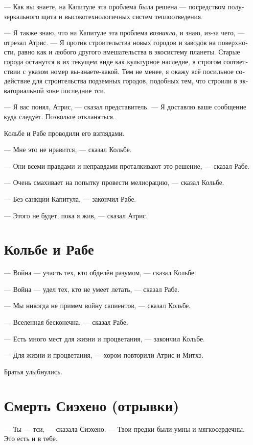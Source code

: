 \documentclass[a4paper,12pt,fleqn]{book}\usepackage{cooltooltips}\usepackage{polyglossia}\setdefaultlanguage[babelshorthands=true]{russian}\setotherlanguage{english}\defaultfontfeatures{Ligatures=TeX,Mapping=tex-text} \usepackage{xcolor}\definecolor{lightgray}{HTML}{bbbbbb}\color{lightgray}\newcommand{\ml}[3]{\textenglish{\textcolor{black}{#3}}}
\begin{document}
{--- Как вы знаете, на Капитуле эта проблема была решена --- посредством полузеркального щита и высокотехнологичных систем теплоотведения.

--- Я также знаю, что на Капитуле эта проблема \emph{возникла}, и знаю, из-за чего, --- отрезал Атрис.
--- Я против строительства новых городов и заводов на поверхности, равно как и любого другого вмешательства в экосистему планеты.
Старые города останутся в их текущем виде как культурное наследие, в строгом соответствии с указом номер вы-знаете-какой.
Тем не менее, я окажу всё посильное содействие для строительства подземных городов, подобных тем, что строили в экваториальной зоне последние тси.

--- Я вас понял, Атрис, --- сказал представитель.
--- Я доставлю ваше сообщение куда следует.
Позвольте откланяться.

Кольбе и Рабе проводили его взглядами.

--- Мне это не нравится, --- сказал Кольбе.

--- Они всеми правдами и неправдами проталкивают это решение, --- сказал Рабе.

--- Очень смахивает на попытку провести мелиорацию, --- сказал Кольбе.

--- Без санкции Капитула, --- закончил Рабе.

--- Этого не будет, пока я жив, --- сказал Атрис.

\section{Кольбе и Рабе}

--- Война --- участь тех, кто обделён разумом, --- сказал Кольбе.

--- Война --- удел тех, кто не умеет летать, --- сказал Рабе.

--- Мы никогда не примем войну сапиентов, --- сказал Кольбе.

--- Вселенная бесконечна, --- сказал Рабе.

--- Есть много мест для жизни и процветания, --- закончил Кольбе.

--- Для жизни и процветания, --- хором повторили Атрис и Митхэ.

Братья улыбнулись.

\section{Смерть Сиэхено (отрывки)}

--- Ты --- тси, --- сказала Сиэхено.
--- Твои предки были умны и мягкосердечны.
Это есть и в тебе.

}
\end{document}
